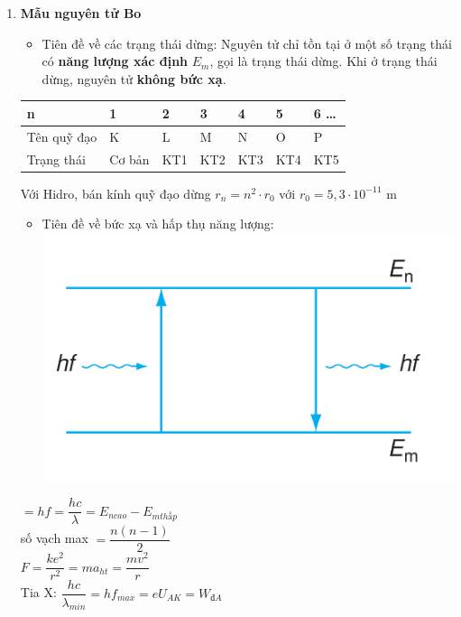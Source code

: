\documentclass[a4paper,12pt,titlepage,twocolumn]{article}
\newenvironment{myitemize} 
{ \begin{itemize}[leftmargin=*,label=-]  %
		\setlength{\itemsep}{0pt}
		\setlength{\parskip}{0pt}
		\setlength{\parsep}{0pt}     }
{ \end{itemize}                  }
\newenvironment{myenumerate}
{ \begin{enumerate}[label=\textbf{\arabic*}.]
\setlist{nolistsep} %
\setlength{\itemsep}{0pt}
\setlength{\parskip}{0pt}
\setlength{\parsep}{0pt}	}
{ \end{enumerate}}
\begin{document}
\begin{myenumerate}
	Bước sóng càng ngắn, tính chất \textbf{hạt} thể hiện càng rõ: \textbf{quang điện, phát quang, ion hóa, khả năng đâm xuyên}
	\item \textbf{Mẫu nguyên tử Bo} 
	\begin{myitemize}
		\item Tiên đề về các trạng thái dừng: Nguyên tử chỉ tồn tại ở một số trạng thái có \textbf{năng lượng xác định}
		$E_m$, gọi là trạng thái dừng. Khi ở trạng thái dừng, nguyên tử \textbf{không bức xạ}.
	\end{myitemize}
	\begin{adjustwidth}{-0.9cm}{}
	\begin{tabular}{|m{2.4cm}|m{0.75cm}|m{0.75cm}|m{0.75cm}|m{0.75cm}|m{0.75cm}|m{1cm}|}
		\hline
		n & 1 & 2 & 3 & 4 & 5 & 6 \ldots \\ \hline
		Tên quỹ đạo & K & L & M & N & O & P \\ \hline
		Trạng thái & Cơ bản & KT1 & KT2 & KT3 & KT4 & KT5 \\ \hline	
	\end{tabular}
	\end{adjustwidth}
	Với Hidro, bán kính quỹ đạo dừng $r_n = n^2 \cdot r_0$ với $r_0 = 5,3 \cdot 10^{-11}$ \si{\meter}
	\begin{myitemize}
		\item Tiên đề về bức xạ và hấp thụ năng lượng:
		\includegraphics[scale=0.2]{image.png}
	\end{myitemize}
	\textepsilon{} $=hf=\dfrac{hc}{\lambda}=E_{n cao} - E_{m thấp}$ \\
	số vạch max $=\dfrac{n(n-1)}{2}$ \\
	$F = \dfrac{ke^2}{r^2} = ma_{ht} = \dfrac{mv^2}{r}$ \\
	Tia X: $\dfrac{hc}{\lambda_{min}} = hf_{max} = eU_{AK} = W_{\textit{đ}A}$

\end{myenumerate}
\end{document}
